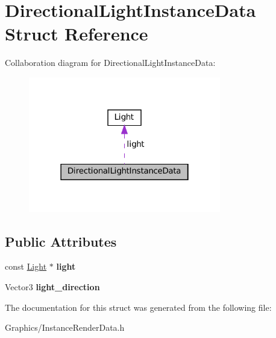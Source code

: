 \hypertarget{structDirectionalLightInstanceData}{}\section{Directional\+Light\+Instance\+Data Struct Reference}
\label{structDirectionalLightInstanceData}


Collaboration diagram for Directional\+Light\+Instance\+Data\+:
\nopagebreak
\begin{figure}[H]
\begin{center}
\leavevmode
\includegraphics[width=238pt]{structDirectionalLightInstanceData__coll__graph}
\end{center}
\end{figure}
\subsection*{Public Attributes}
\begin{DoxyCompactItemize}
\item 
\mbox{\label{structDirectionalLightInstanceData_a07be794f18422b2d6698a37bf7d5d5bf}} 
const \hyperlink{classLight}{Light} $\ast$ {\bfseries light}
\item 
\mbox{\label{structDirectionalLightInstanceData_a5730d9b55f2190051d12deea1782b229}} 
Vector3 {\bfseries light\+\_\+direction}
\end{DoxyCompactItemize}


The documentation for this struct was generated from the following file\+:\begin{DoxyCompactItemize}
\item 
Graphics/Instance\+Render\+Data.\+h\end{DoxyCompactItemize}
